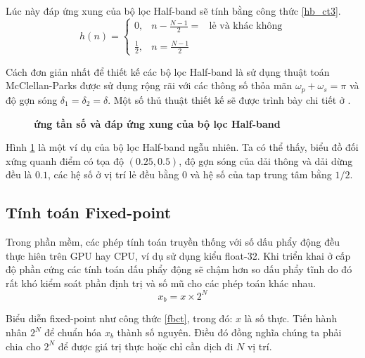 Lúc này đáp ứng xung của bộ lọc Half-band sẽ tính bằng công thức \ref{hb_ct3}.
\begin{equation}\label{hb_ct3}
 h(n)=\left\{\begin{matrix}
0, & \displaystyle n - \frac{N-1}{2} = & \text{lẻ và khác không}\\ 
& &\\ 
\displaystyle \frac{1}{2},& n = \displaystyle \frac{N-1}{2} &
\end{matrix}\right.
\end{equation}

Cách đơn giản nhất để thiết kế các bộ lọc Half-band là sử dụng thuật toán McClellan-Parks \cite{rao2018digital} được sử dụng rộng rãi với các thông số thỏa mãn $\omega_p + \omega_s = \pi$ và độ gợn sóng $\delta_1=\delta_2=\delta$. Một số thủ thuật thiết kế sẽ được trình bày chi tiết ở \cite{half_band}.

\begin{figure}[ht!]
    \centering
    
    \caption[Đáp ứng tần số cường độ và đáp ứng xung của bộ lọc Half-band]{\bfseries \fontsize{12pt}{0pt} ứng tần số và đáp ứng xung của bộ lọc Half-band}
    \label{half_band_example}
\end{figure}
Hình \ref{half_band_example} là một ví dụ của bộ lọc Half-band ngẫu nhiên. Ta có thể thấy, biểu đồ đối xứng quanh điểm có tọa độ $(0.25, 0.5)$, độ gợn sóng của dải thông và dải dừng đều là $0.1$, các hệ số ở vị trí lẻ đều bằng 0 và hệ số của tap trung tâm bằng $1/2$.

\subsection{Tính toán Fixed-point}
Trong phần mềm, các phép tính toán truyền thống với số dấu phẩy động đều thực hiên trên GPU hay CPU, ví dụ sử dụng kiểu float-32. Khi triển khai ở cấp độ phần cứng các tính toán dấu phẩy động sẽ chậm hơn so dấu phẩy tĩnh do đó rất khó kiểm soát phần định trị và số mũ cho các phép toán khác nhau.
\begin{equation} \label{fbct}
    x_b = x \times 2^N
\end{equation}

Biểu diễn fixed-point như công thức \ref{fbct}, trong đó: $x$ là số thực. Tiến hành nhân $2^N$ để chuẩn hóa $x_b$ thành số nguyên. Điều đó đồng nghĩa chúng ta phải chia cho $2^N$ để được giá trị thực hoặc chỉ cần dịch đi $N$ vị trí.
